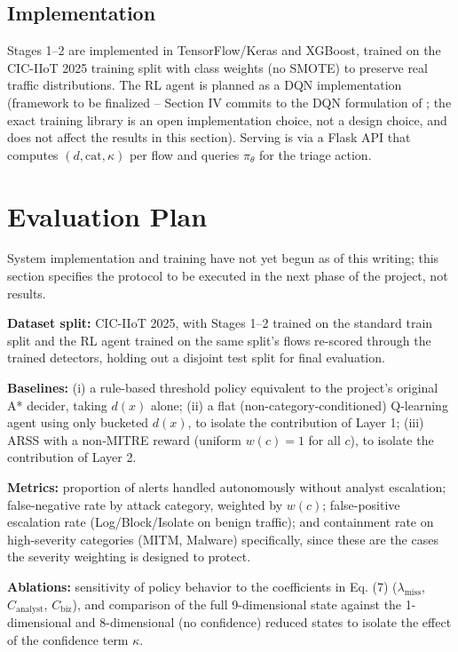 \documentclass[conference]{IEEEtran}
\newcommand{\categ}{\text{cat}}
\newcommand{\danger}{d}
\newcommand{\conf}{\kappa}
\newcommand{\sev}{w}
\begin{document}
\subsection{Implementation}

Stages 1--2 are implemented in TensorFlow/Keras and XGBoost, trained on the CIC-IIoT 2025 training split with class weights (no SMOTE) to preserve real traffic distributions. The RL agent is planned as a DQN implementation (framework to be finalized -- Section IV commits to the DQN formulation of \cite{mnih2015}; the exact training library is an open implementation choice, not a design choice, and does not affect the results in this section). Serving is via a Flask API that computes $(\danger,\categ,\conf)$ per flow and queries $\pi_\theta$ for the triage action.

\section{Evaluation Plan}

System implementation and training have not yet begun as of this writing; this section specifies the protocol to be executed in the next phase of the project, not results.

\textbf{Dataset split:} CIC-IIoT 2025, with Stages 1--2 trained on the standard train split and the RL agent trained on the same split's flows re-scored through the trained detectors, holding out a disjoint test split for final evaluation.

\textbf{Baselines:} (i) a rule-based threshold policy equivalent to the project's original A* decider, taking $\danger(x)$ alone; (ii) a flat (non-category-conditioned) Q-learning agent using only bucketed $\danger(x)$, to isolate the contribution of Layer 1; (iii) ARSS with a non-MITRE reward (uniform $\sev(c)=1$ for all $c$), to isolate the contribution of Layer 2.

\textbf{Metrics:} proportion of alerts handled autonomously without analyst escalation; false-negative rate by attack category, weighted by $\sev(c)$; false-positive escalation rate (Log/Block/Isolate on benign traffic); and containment rate on high-severity categories (MITM, Malware) specifically, since these are the cases the severity weighting is designed to protect.

\textbf{Ablations:} sensitivity of policy behavior to the coefficients in Eq. (7) ($\lambda_{\text{miss}}$, $C_{\text{analyst}}$, $C_{\text{biz}}$), and comparison of the full 9-dimensional state against the 1-dimensional and 8-dimensional (no confidence) reduced states to isolate the effect of the confidence term $\conf$.
\end{document}
